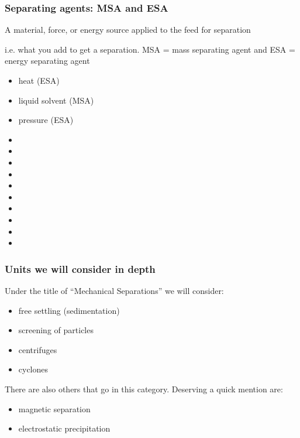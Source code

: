 \begin{frame}\frametitle{Separating agents: MSA and ESA}
	\begin{exampleblock}
		{\small A material, force, or energy source applied to the feed for separation }
	\end{exampleblock}
	\vspace{6pt}
	i.e. what you add to get a separation. MSA = mass separating agent and ESA = energy separating agent
	\vspace{6pt}	
	\begin{itemize}
		\item	heat (ESA)
		\item	liquid solvent (MSA)
		\item	pressure (ESA)
		\item	\pause\iftoggle{instructor}{vacuum}{}
		\item	\iftoggle{instructor}{membrane}{}
		\item	\iftoggle{instructor}{filter media}{}
		\item	\iftoggle{instructor}{electric field}{}
		\item	\iftoggle{instructor}{flow}{}
		\item	\iftoggle{instructor}{temperature gradient}{}
		\item	\iftoggle{instructor}{concentration gradient}{}
		\item	\iftoggle{instructor}{gravitational field (natural, or artificially created)}{}
		\item	\iftoggle{instructor}{adsorbent}{}
		\item	\iftoggle{instructor}{absorbent}{}
	\end{itemize}
\end{frame}

\begin{frame}\frametitle{Units we will consider in depth}
	Under the title of ``Mechanical Separations'' we will consider:
	\begin{itemize}
		\item	free settling (sedimentation)
		\item	screening of particles 
		\item	centrifuges
		\item	cyclones
	\end{itemize}
	
	\vspace{12pt}
	There are also others that go in this category. Deserving a quick mention are:
	\begin{itemize}
		\item	magnetic separation
		\item	electrostatic precipitation
	\end{itemize}
\end{frame}

